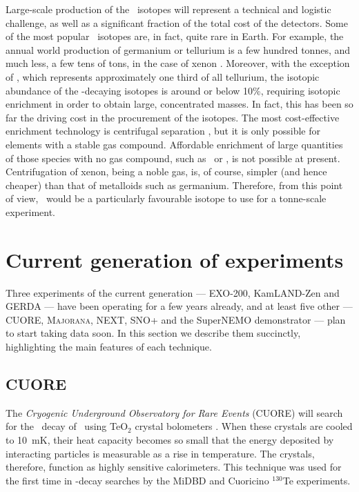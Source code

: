 \documentclass{PoS}
\begin{document}
Large-scale production of the \bb\ isotopes will represent a technical and logistic challenge, as well as a significant fraction of the total cost of the detectors. Some of the most popular \bb\ isotopes are, in fact, quite rare in Earth. For example, the annual world production of germanium or tellurium is a few hundred tonnes, and much less, a few tens of tons, in the case of xenon \cite{Biller:2013wua}. Moreover, with the exception of \TE, which represents approximately one third of all tellurium, the isotopic abundance of the \bb-decaying isotopes is around or below 10\%, requiring isotopic enrichment in order to obtain large, concentrated masses. In fact, this has been so far the driving cost in the procurement of the isotopes. The most cost-effective enrichment technology is centrifugal separation \cite{Biller:2013wua, Tikhomirov:2000td, Giuliani:2012zu}, but it is only possible for elements with a stable gas compound. Affordable enrichment of large quantities of those species with no gas compound, such as \CA\ or \ND, is not possible at present. Centrifugation of xenon, being a noble gas, is, of course, simpler (and hence cheaper) than that of metalloids such as germanium. Therefore, from this point of view, \XE\ would be a particularly favourable isotope to use for a tonne-scale experiment.


\section{Current generation of experiments} \label{sec:CurrentExperiments}
Three experiments of the current generation --- EXO-200, KamLAND-Zen and GERDA --- have been operating for a few years already, and at least five other --- CUORE, {\scshape Majorana}, NEXT, SNO+ and the SuperNEMO demonstrator --- plan to start taking data soon. In this section we describe them succinctly, highlighting the main features of each technique. 


\subsection{CUORE} \label{subsec:CUORE}
The \emph{Cryogenic Underground Observatory for Rare Events} (CUORE) will search for the \bbonu\ decay of \TE\ using TeO$_{2}$ crystal bolometers \cite{Artusa:2014lgv}. When these crystals are cooled to 10~mK, their heat capacity becomes so small that the energy deposited by interacting particles is measurable as a rise in temperature. The crystals, therefore, function as highly sensitive calorimeters. This technique was used for the first time in \bbonu-decay searches by the MiDBD \cite{Arnaboldi:2002te} and Cuoricino \cite{Andreotti:2010vj} $^{130}$Te experiments. 
\end{document}
